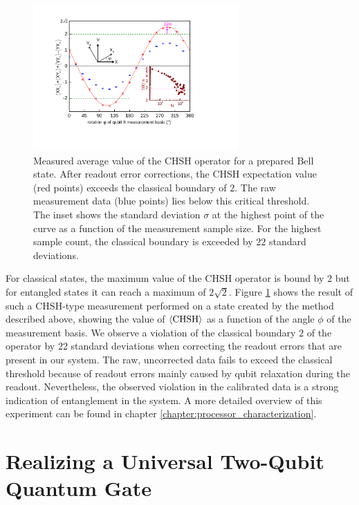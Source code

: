 %
\begin{figure}[ht!]
 \centering \includegraphics[width=0.7\textwidth]{./material/papers/iswap/submission1/Dewes_Figure3}
\caption[Measurement of the CHSH operator of an entangled two-qubit state]{Measured average value of the CHSH operator for a prepared
Bell state. After readout error corrections, the CHSH expectation
value (red points) exceeds the classical boundary of $2$. The raw
measurement data (blue points) lies below this critical threshold.
The inset shows the standard deviation $\sigma$ at the highest point
of the curve as a function of the measurement sample size. For the
highest sample count, the classical boundary is exceeded by $22$
standard deviations.}


\label{fig:chsh_measurement} %
\end{figure}


For classical states, the maximum value of the $\mathrm{CHSH}$ operator
is bound by $2$ but for entangled states it can reach a maximum of
$2\sqrt{2}$. Figure \ref{fig:chsh_measurement}
shows the result of such a $\mathrm{CHSH}$-type measurement performed
on a state created by the method described above, showing the value
of $\left< \mathrm{CHSH} \right>$ as a function of the angle $\phi$ of
the measurement basis. We observe a violation of the classical boundary $2$
of the operator by $22$ standard deviations when correcting the readout
errors that are present in our system. The raw, uncorrected data fails
to exceed the classical threshold because of readout errors mainly
caused by qubit relaxation during the readout. Nevertheless, the observed
violation in the calibrated data is a strong indication
of entanglement in the system. A more detailed overview of this experiment can be found in chapter \ref{chapter:processor_characterization}.


\section{Realizing a Universal Two-Qubit Quantum Gate}

